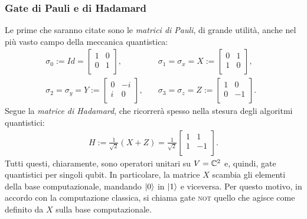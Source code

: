 \subsubsection{Gate di Pauli e di Hadamard}
Le prime che saranno citate sono le \textit{matrici di Pauli}, di grande utilità, anche nel più vasto campo della meccanica quantistica:
\begin{align}
\sigma_0 := Id = \begin{bmatrix}
      1 &   0   \\
      0 &   1   \\
     \end{bmatrix},
 \quad &
 \sigma_1 = \sigma_x = X := \begin{bmatrix}
      0 &   1   \\
      1 &   0   \\
     \end{bmatrix},
 \quad\\
\sigma_2 = \sigma_y = Y := \begin{bmatrix}
      0 &  -i   \\
      i &   0   \\
     \end{bmatrix},
 \quad &
 \sigma_3 = \sigma_z = Z := \begin{bmatrix}
      1 &   0   \\
      0 &   -1   \\
     \end{bmatrix}.
\end{align}
Segue la \textit{matrice di Hadamard}, che ricorrerà spesso nella stesura degli algoritmi quantistici:
\begin{align*}
 H := \frac{1}{\sqrt{2}}\left(X + Z \right) = 
 \frac{1}{\sqrt{2}} 
 \begin{bmatrix}
      1 &   1   \\
      1 &   -1   \\
 \end{bmatrix}.
\end{align*}
Tutti questi, chiaramente, sono operatori unitari su $V = \mathbb{C}^{2}$ e, quindi, gate quantistici per singoli qubit.
In particolare, la matrice $X$ scambia gli elementi della base computazionale, mandando $\ket{0}$ in $\ket{1}$ e viceversa.
Per questo motivo, in accordo con la computazione classica, si chiama gate \textsc{not} quello che agisce come definito da $X$ sulla base computazionale.


